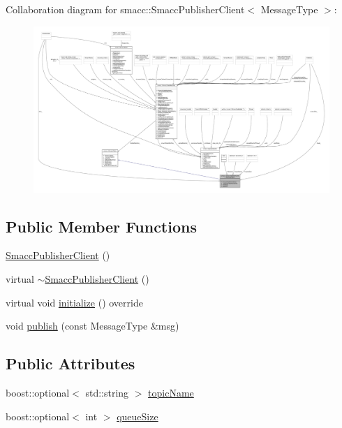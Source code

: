 Collaboration diagram for smacc\+:\+:Smacc\+Publisher\+Client$<$ Message\+Type $>$\+:
\nopagebreak
\begin{figure}[H]
\begin{center}
\leavevmode
\includegraphics[width=350pt]{classsmacc_1_1SmaccPublisherClient__coll__graph}
\end{center}
\end{figure}
\subsection*{Public Member Functions}
\begin{DoxyCompactItemize}
\item 
\hyperlink{classsmacc_1_1SmaccPublisherClient_a6de292c35d99dcac6f28795d6056d985}{Smacc\+Publisher\+Client} ()
\item 
virtual \hyperlink{classsmacc_1_1SmaccPublisherClient_ac6b30c30f15f460bf004e71a10c92f35}{$\sim$\+Smacc\+Publisher\+Client} ()
\item 
virtual void \hyperlink{classsmacc_1_1SmaccPublisherClient_ac1b9a683a411f4957411fcbdb3980233}{initialize} () override
\item 
void \hyperlink{classsmacc_1_1SmaccPublisherClient_aa635210d9104a5b6f3ea15cb2bf16518}{publish} (const Message\+Type \&msg)
\end{DoxyCompactItemize}
\subsection*{Public Attributes}
\begin{DoxyCompactItemize}
\item 
boost\+::optional$<$ std\+::string $>$ \hyperlink{classsmacc_1_1SmaccPublisherClient_a513289e0a918f4e69ca9a93e82349965}{topic\+Name}
\item 
boost\+::optional$<$ int $>$ \hyperlink{classsmacc_1_1SmaccPublisherClient_a51f37a2a51c8e24ccf977a10b2127bf7}{queue\+Size}
\end{DoxyCompactItemize}
